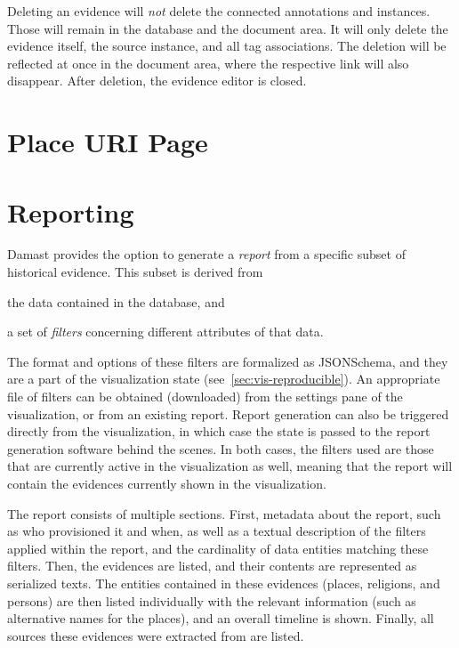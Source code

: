 Deleting an evidence will \emph{not} delete the connected annotations and instances.
Those will remain in the database and the document area.
It will only delete the evidence itself, the source instance, and all tag associations.
The deletion will be reflected at once in the document area, where the respective link will also disappear.
After deletion, the evidence editor is closed.


\section{Place URI Page}
\label{sec:place-uri-page}


\section{Reporting}
\label{sec:reporting}

Damast provides the option to generate a \emph{report} from a specific subset of historical evidence.
This subset is derived from
\begin{enumerate*}[label=(\arabic*)]
  \item the data contained in the database, and
  \item a set of \emph{filters} concerning different attributes of that data.
\end{enumerate*}
The format and options of these filters are formalized as JSONSchema, and they are a part of the visualization state (see~\cref{sec:vis-reproducible}).
An appropriate file of filters can be obtained (downloaded) from the settings pane of the visualization, or from an existing report.
Report generation can also be triggered directly from the visualization, in which case the state is passed to the report generation software behind the scenes.
In both cases, the filters used are those that are currently active in the visualization as well, meaning that the report will contain the evidences currently shown in the visualization.

The report consists of multiple sections.
First, metadata about the report, such as who provisioned it and when, as well as a textual description of the filters applied within the report, and the cardinality of data entities matching these filters.
Then, the evidences are listed, and their contents are represented as serialized texts.
The entities contained in these evidences (places, religions, and persons) are then listed individually with the relevant information (such as alternative names for the places), and an overall timeline is shown.
Finally, all sources these evidences were extracted from are listed.

